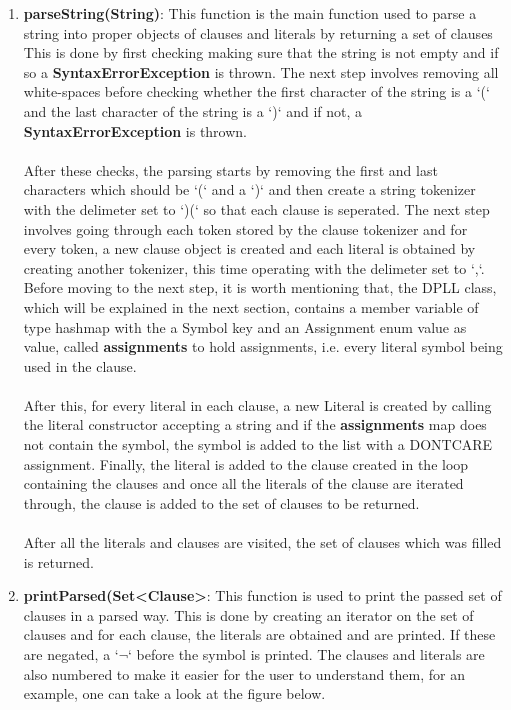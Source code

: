 \documentclass{article}
\begin{document}
			\begin{enumerate}
		\item \textbf{parseString(String)}: This function is the main function used to parse a string into proper objects of clauses and literals by returning a set of clauses\\
		This is done by first checking making sure that the string is not empty and if so a \textbf{SyntaxErrorException} is thrown. The next step involves removing all white-spaces before checking whether the first character of the string is a `(` and the last character of the string is a `)` and if not, a \textbf{SyntaxErrorException} is thrown.\\\\
		After these checks, the parsing starts by removing the first and last characters which should be `(` and a `)` and then create a string tokenizer with the delimeter set to `)(` so that each clause is seperated. The next step involves going through each token stored by the clause tokenizer and for every token, a new clause object is created and each literal is obtained by creating another tokenizer, this time operating with the delimeter set to `,`. Before moving to the next step, it is worth mentioning that, the DPLL class, which will be explained in the next section, contains a member variable of type hashmap with the a Symbol key and an Assignment enum value as value, called \textbf{assignments} to hold assignments, i.e. every literal symbol being used in the clause. \\\\
		After this, for every literal in each clause, a new Literal is created by calling the literal constructor accepting a string and if the \textbf{assignments} map does not contain the symbol, the symbol is added to the list with a DONTCARE assignment. Finally, the literal is added to the clause created in the loop containing the clauses and once all the literals of the clause are iterated through, the clause is added to the set of clauses to be returned. \\\\
		After all the literals and clauses are visited, the set of clauses which was filled is returned.
		
		
		\item \textbf{printParsed(Set\textless Clause\textgreater}: This function is used to print the passed set of clauses in a parsed way. This is done by creating an iterator on the set of clauses and for each clause, the literals are obtained and are printed. If these are negated, a `$\neg$` before the symbol is printed. The clauses and literals are also numbered to make it easier for the user to understand them, for an example, one can take a look at the figure below.
		

\end{enumerate}
\end{document}
